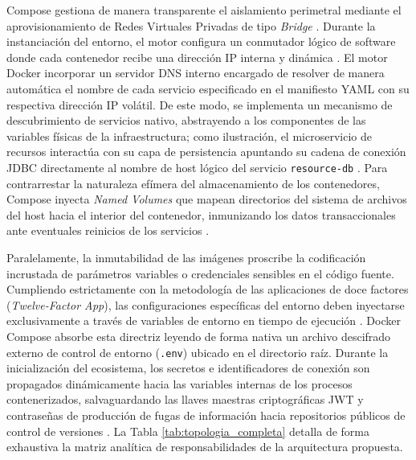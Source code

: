 \documentclass[12pt,journal,onecolumn]{IEEEtran}
\begin{document}
Compose gestiona de manera transparente el aislamiento perimetral mediante el aprovisionamiento de Redes Virtuales Privadas de tipo \textit{Bridge} \cite{burns2025}. Durante la instanciación del entorno, el motor configura un conmutador lógico de software donde cada contenedor recibe una dirección IP interna y dinámica \cite{burns2025, al-asfoor2024}. El motor Docker incorporar un servidor DNS interno encargado de resolver de manera automática el nombre de cada servicio especificado en el manifiesto YAML con su respectiva dirección IP volátil. De este modo, se implementa un mecanismo de descubrimiento de servicios nativo, abstrayendo a los componentes de las variables físicas de la infraestructura; como ilustración, el microservicio de recursos interactúa con su capa de persistencia apuntando su cadena de conexión JDBC directamente al nombre de host lógico del servicio \texttt{resource-db} \cite{burns2025, richardson2018}. Para contrarrestar la naturaleza efímera del almacenamiento de los contenedores, Compose inyecta \textit{Named Volumes} que mapean directorios del sistema de archivos del host hacia el interior del contenedor, inmunizando los datos transaccionales ante eventuales reinicios de los servicios \cite{al-asfoor2024}.

Paralelamente, la inmutabilidad de las imágenes proscribe la codificación incrustada de parámetros variables o credenciales sensibles en el código fuente. Cumpliendo estrictamente con la metodología de las aplicaciones de doce factores (\textit{Twelve-Factor App}), las configuraciones específicas del entorno deben inyectarse exclusivamente a través de variables de entorno en tiempo de ejecución \cite{richardson2018}. Docker Compose absorbe esta directriz leyendo de forma nativa un archivo descifrado externo de control de entorno (\texttt{.env}) ubicado en el directorio raíz. Durante la inicialización del ecosistema, los secretos e identificadores de conexión son propagados dinámicamente hacia las variables internas de los procesos contenerizados, salvaguardando las llaves maestras criptográficas JWT y contraseñas de producción de fugas de información hacia repositorios públicos de control de versiones \cite{richardson2018}. La Tabla \ref{tab:topologia_completa} detalla de forma exhaustiva la matriz analítica de responsabilidades de la arquitectura propuesta.
\end{document}
